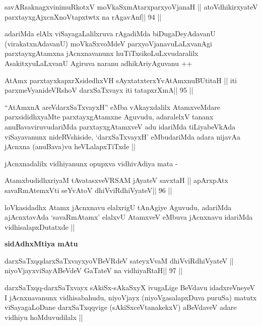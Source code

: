 \begin{shl}
savARsaknagxvinimuRkotxV moVkaSxmAtarxparxyoVjanaH ||
atoV\s dhikirxyateV parxtayxgAjxcnXnoVtapxtwtx na rAgavAnf\hfill || 94 ||
\end{shl}

\begin{artha}
adariMda elAlx viSayagaLalilxruva rAgadiMda biDugaDeyAdavanU
(virakatxnAdavanU) moVkaSxvoMdeV parxyoVjanavuLaLxvanAgi
parxtayxgAtamxna jAcnxnavanunx huTiTxsikoLuLxvudaralilx
AsakitxyuLaLxvanU Agiruva naranu adhikAriyAguvanu ++
\end{artha}

\begin{shl}
AtAmx parxtayxkapxrXsidedhxVH sAyxtatxterxYvA\s\s tAmxnuBUtitaH ||
iti parxmeVyanideVRshoV darxSaTxvayx iti tatapxrXmA\hfill || 95 ||
\end{shl}

\begin{artha}
``AtAmxnA areVdarxSaTxvayxH'' eMba vAkayxdalilx AtamxveMdare
  parxsididhxyaMte parxtayxgAtamxne Aguvudu, adaralelxV tananx
  anuBavaviruvudariMda parxtayxgAtamxveV adu idariMda tiLiyabeVkAda
  viSayavanunx nideRVshiside, `darxSaTxvayxH' eMbudariMda adara
  nijavAa jAcnxna (anuBava)vu heVLalapxTiTxde ||
\end{artha}

\begin{artha}
jAcnxnadalilx vidhiyanunx opupxva vidhivAdiya mata -
\end{artha}

\begin{shl}
AtamxbudidhxriyaM tAvatasxveVRSAM jAyateV savxtaH ||
apArxpAtx savaRmAtemxVti seYvAtoV dhiVviRdhiVyateV\hfill || 96 ||
\end{shl}

\begin{artha}
loVkasidadhx Atamx jAcnxnavu elalxrigU tAnAgiye Aguvudu, adariMda
ajAcnxtavAda `savaRmAtamx' elalxvU AtamxveV eMbuva jAcnxnavu idariMda
vidhisalapxDutatxde ||
\end{artha}

\begin{artha}
\textbf{sidAdhxMtiya mAtu}
\end{artha}

\begin{shl}
darxSaTxqqdarxSaTxvayxyoVBeVRdeV sateyxVvaM dhiVviRdhiVyateV ||
niyoVjayxviSayABeVdeV GaTateV na vidhiyaRtaH\hfill || 97 ||
\end{shl}

\begin{artha}
darxSaTxqq-darxSaTxvayx sAkiSx-sAkaSxyX ivugaLige BeVdavu
idadxreVneyeV I jAcnxnavanunx vidhisabahudu, niyoVjayx
(niyoVgasalapxDuva puruSa) matutx viSayagaLoDane darxSaTxqqvige
(sAkiSxceVtanakekxV) aBeVdaveV adare vidhiyu hoMduvudilalx || 
\end{artha}

